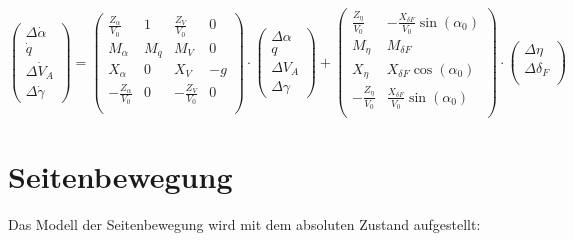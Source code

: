 \begin{equation}\label{eq:laengsbewegung}
	\begin{pmatrix}
		\Delta \dot \alpha\\
		\dot q\\
		\Delta \dot V_A\\
		\Delta \dot \gamma
	\end{pmatrix} = 
	\begin{pmatrix}
		\frac{Z_\alpha}{V_0} & 1 & \frac{Z_V}{V_0} & 0\\
		M_\alpha & M_q & M_V & 0\\
		X_\alpha & 0 & X_V & -g\\
		-\frac{Z_\alpha}{V_0} & 0 & -\frac{Z_V}{V_0} & 0\\
	\end{pmatrix} \cdot
	\begin{pmatrix}
		\Delta \alpha\\
		q\\
		\Delta V_A\\
		\Delta \gamma
	\end{pmatrix} + 
	\begin{pmatrix}
		\frac{Z_\eta}{V_0} & -\frac{X_{\delta F}}{V_0} \sin{(\alpha_0)}\\
		M_\eta & M_{\delta F}\\
		X_\eta & X_{\delta F} \cos{(\alpha_0)}\\
		-\frac{Z_\eta}{V_0} & \frac{X_{\delta F}}{V_0} \sin{(\alpha_0)}\\
	\end{pmatrix}\cdot
	\begin{pmatrix}
		\Delta \eta\\
		\Delta \delta_F\\
	\end{pmatrix}
\end{equation}

\section{Seitenbewegung}
Das Modell der Seitenbewegung wird mit dem absoluten Zustand aufgestellt:

